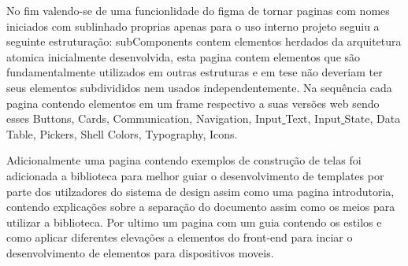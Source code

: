   No fim valendo-se de uma funcionlidade do figma de tornar paginas com nomes iniciados com sublinhado proprias apenas para o uso interno projeto seguiu a seguinte estruturação: \underline{ }subComponents contem elementos herdados da arquitetura atomica inicialmente desenvolvida, esta pagina contem elementos que são fundamentalmente utilizados em outras estruturas e em tese não deveriam ter seus elementos subdivididos nem usados independentemente. Na sequência cada pagina contendo elementos em um frame respectivo a suas versões web sendo esses Buttons, Cards, Communication, Navigation, Input\underline{ }Text, Input\underline{ }State, Data\underline{ }Table, Pickers, Shell Colors, Typography, Icons.

  Adicionalmente uma pagina contendo exemplos de construção de telas foi adicionada a biblioteca para melhor guiar o desenvolvimento de templates por parte dos utilzadores do sistema de design assim como uma pagina introdutoria, contendo explicações sobre a separação do documento assim como os meios para utilizar a biblioteca. Por ultimo um pagina com um guia contendo os estilos e como aplicar diferentes elevações a elementos do front-end para inciar o desenvolvimento de elementos para dispositivos moveis.